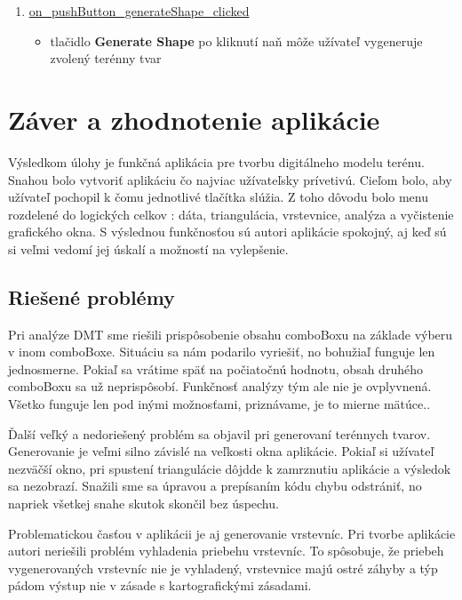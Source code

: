 \documentclass[12pt]{article}
\begin{document}
\begin{enumerate}
\item[] \underline{on\_pushButton\_generateShape\_clicked}
\begin{itemize}
\item tlačidlo \textbf{Generate Shape} po kliknutí naň môže užívateľ vygeneruje zvolený terénny tvar
\end{itemize}



\end{enumerate}


\clearpage
\section{Záver a zhodnotenie aplikácie}
Výsledkom úlohy je funkčná aplikácia pre tvorbu digitálneho modelu terénu. Snahou bolo vytvoriť aplikáciu čo najviac užívateľsky prívetivú. Cieľom bolo, aby užívateľ pochopil k čomu jednotlivé tlačítka slúžia. Z toho dôvodu bolo menu rozdelené do logických celkov : dáta, triangulácia, vrstevnice, analýza a vyčistenie grafického okna. S výslednou funkčnosťou sú autori aplikácie spokojný, aj keď sú si veľmi vedomí jej úskalí a možností na vylepšenie.

\subsection{Riešené problémy}
Pri analýze DMT sme riešili prispôsobenie obsahu comboBoxu na základe výberu v inom comboBoxe. Situáciu sa nám podarilo vyriešiť, no bohužiaľ funguje len jednosmerne. Pokiaľ sa vrátime späť na počiatočnú hodnotu, obsah druhého comboBoxu sa už neprispôsobí. Funkčnosť analýzy tým ale nie je ovplyvnená. Všetko funguje len pod inými možnosťami, priznávame, je to mierne mätúce.. 

Ďalší veľký a nedoriešený problém sa objavil pri generovaní terénnych tvarov. Generovanie je veľmi silno závislé na veľkosti okna aplikácie. Pokiaľ si užívateľ nezväčší okno, pri spustení triangulácie dôjdde k zamrznutiu aplikácie a výsledok sa nezobrazí. Snažili sme sa úpravou a prepísaním kódu chybu odstrániť, no napriek všetkej snahe skutok skončil bez úspechu.

Problematickou časťou v aplikácii je aj generovanie vrstevníc. Pri tvorbe aplikácie autori neriešili problém vyhladenia priebehu vrstevníc. To spôsobuje, že priebeh vygenerovaných vrstevníc nie je vyhladený, vrstevnice majú ostré záhyby a týp pádom výstup nie v zásade s kartografickými zásadami. 
\end{document}
